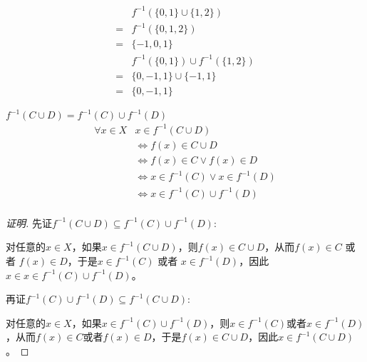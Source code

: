 \documentclass{article}
\begin{document}
\begin{CJK*}{UTF8}{gbsn}

\begin{equation*}
  \begin{split}
    &f^{-1}(\{0,1\}\cup \{1,2\})\\
    =&f^{-1}(\{0,1,2\})\\
    =&\{-1,0,1\}\\
    &f^{-1}(\{0,1\})\cup f^{-1}(\{1,2\})\\
    =&\{0,-1,1\}\cup \{-1,1\}\\
    =&\{0,-1,1\}
  \end{split}
\end{equation*}

$f^{-1}(C \cup D) = f^{-1}(C) \cup f^{-1}(D)$
\begin{equation*}
  \begin{split}
    \forall x \in X &x\in f^{-1}(C \cup D)\\
    &\Leftrightarrow f(x) \in C \cup D\\
    &\Leftrightarrow f(x) \in C \lor f(x) \in D\\
    &\Leftrightarrow x \in f^{-1}(C) \lor x \in f^{-1}(D)\\
    &\Leftrightarrow x \in f^{-1}(C) \cup f^{-1}(D)\\
  \end{split}
\end{equation*}
\begin{proof}[证明]
  先证$f^{-1}(C \cup D) \subseteq f^{-1}(C) \cup f^{-1}(D)$:
  
  对任意的$x\in X$，如果$x\in f^{-1}(C \cup D)$，则$f(x) \in C \cup D$，从而$f(x) \in C$ 或者 $f(x) \in D$，于是$x \in f^{-1}(C)$ 或者 $x \in f^{-1}(D)$，因此$x\in x \in f^{-1}(C) \cup f^{-1}(D)$。
  
  再证$f^{-1}(C) \cup f^{-1}(D)\subseteq f^{-1}(C \cup D)$:

  对任意的$x\in X$，如果$x\in f^{-1}(C) \cup f^{-1}(D)$，则$x\in f^{-1}(C)$或者$x \in f^{-1}(D)$，从而$f(x) \in C$或者$f(x) \in D$，于是$f(x) \in C \cup D$，因此$x\in f^{-1}(C \cup D)$。
\end{proof}
\end{CJK*}
\end{document}
